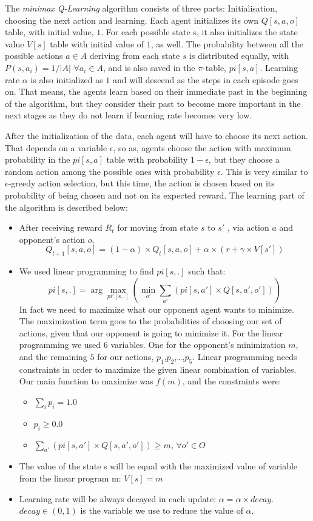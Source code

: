 \documentclass[a4paper,11pt]{article}
\begin{document}
The \textit{minimax Q-Learning} algorithm consists of three parts: 	Initialisation, choosing the next action and learning. Each agent initializes its own $Q[s,a,o]$ table, with initial value, $1$. For each possible state s, it also initializes the state value $V[s]$ table with initial value of $1$, as well. The probability between all the possible actions $a \in A$ deriving from each state $s$ is distributed equally, with $P(s,a_{i}) = 1/|A|$ $\forall a_i \in A$, and is also saved in the $\pi$-table, $pi[s,a]$. Learning rate $\alpha$ is also initialized as $1$ and will descend as the steps in each episode goes on. That means, the agents learn based on their immediate past in the beginning of the algorithm, but they consider their past to become more important in the next stages as they do not learn if learning rate becomes very low.

After the initialization of the data, each agent will have to choose its next action. That depends on a variable $\epsilon$, so as, agents choose the action with maximum probability in the $pi[s,a]$ table with probability $1-\epsilon$, but they choose a random action among the possible ones with probability $\epsilon$. This is very similar to $\epsilon$-greedy action selection, but this time, the action is chosen based on its probability of being chosen and not on its expected reward. The learning part of the algorithm is described below:

\begin{itemize}
\item After receiving reward $R_t$ for moving from state $s$ to $s'$ , via action $a$ and opponent's action $o$,
\[
Q_{t+1}[s,a,o] = (1-\alpha)\times Q_t[s,a,o] + \alpha \times (r + \gamma \times V[s'])
\]

\item We used linear programming to find $pi[s,.]$ such that:
\[
pi[s,.] = \arg\max_{pi'[s,.]} {(\min_{o'} \sum_{a'} (pi[s,a'] \times Q[s,a',o']))}
\]
In fact we need to maximize what our opponent agent wants to minimize. The maximization term goes to the probabilities of choosing our set of actions, given that our opponent is going to minimize it. For the linear programming we used $6$ variables. One for the opponent's minimization $m$, and the remaining $5$ for our actions, $p_1$,$p_2$,\ldots,$p_5$. Linear programming needs constraints in order to maximize the given linear combination of variables. Our main function to maximize was $f(m)$, and the constraints were:
\begin{itemize}
\item $ \sum_{i}{p_i} = 1.0$
\item $ p_i \geq 0.0$
\item $ \sum_{a'} (pi[s,a'] \times Q[s,a',o']) \geq m$, $\forall o' \in O$
\end{itemize}
\item The value of the state s will be equal with the maximized value of variable from the linear program m: $V[s] = m$
\item Learning rate will be always decayed in each update: $\alpha = \alpha \times decay$. $decay \in (0,1)$ is the variable we use to reduce the value of $\alpha$.
\end{itemize}
\end{document}
